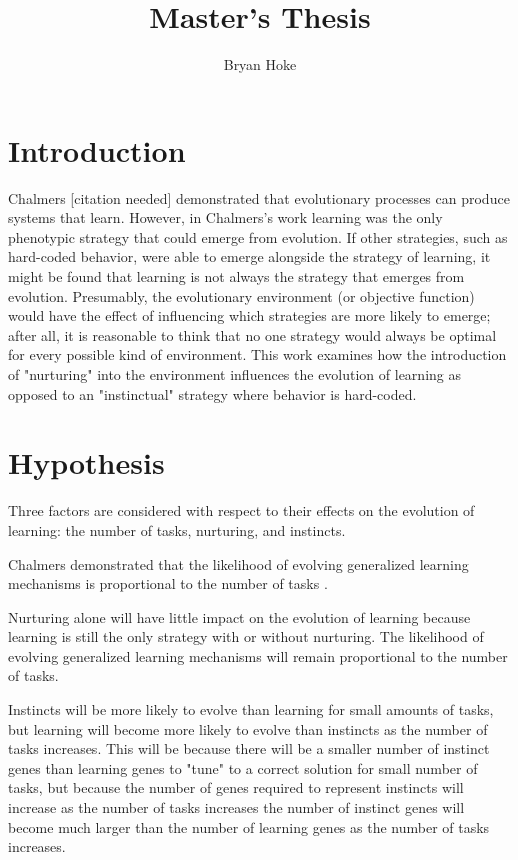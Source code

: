 \documentclass[master]{outhesis}
\title{Master's Thesis}
\author{Bryan Hoke}
\begin{document}
\makefrontmatter

\chapter{Introduction}

Chalmers [citation needed] demonstrated that evolutionary processes can produce systems that learn.
However, in Chalmers's work learning was the only phenotypic strategy that could emerge from evolution.
If other strategies, such as hard-coded behavior, were able to emerge alongside the strategy of learning, it might be found that learning is not always the strategy that emerges from evolution.
Presumably, the evolutionary environment (or objective function) would have the effect of influencing which strategies are more likely to emerge; after all, it is reasonable to think that no one strategy would always be optimal for every possible kind of environment.
This work examines how the introduction of "nurturing" into the environment influences the evolution of learning as opposed to an "instinctual" strategy where behavior is hard-coded.

\chapter{Hypothesis}

Three factors are considered with respect to their effects on the evolution of learning: the number of tasks, nurturing, and instincts.

Chalmers demonstrated that the likelihood of evolving generalized learning mechanisms is proportional to the number of tasks .

Nurturing alone will have little impact on the evolution of learning because learning is still the only strategy with or without nurturing. The likelihood of evolving generalized learning mechanisms will remain proportional to the number of tasks.

Instincts will be more likely to evolve than learning for small amounts of tasks, but learning will become more likely to evolve than instincts as the number of tasks increases. This will be because there will be a smaller number of instinct genes than learning genes to "tune" to a correct solution for small number of tasks, but because the number of genes required to represent instincts will increase as the number of tasks increases the number of instinct genes will become much larger than the number of learning genes as the number of tasks increases.
\end{document}
